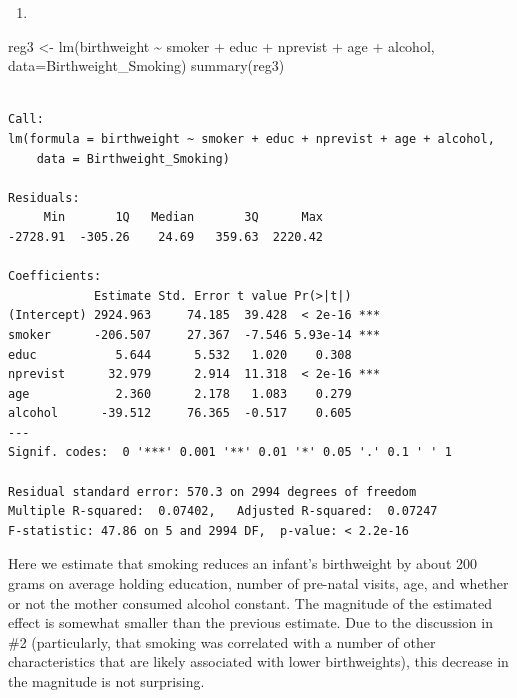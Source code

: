 \documentclass[
  letterpaper,
  DIV=11,
  numbers=noendperiod]{scrreprt}
\newenvironment{Shaded}{\begin{snugshade}}{\end{snugshade}}
\newcommand{\AttributeTok}[1]{\textcolor[rgb]{0.40,0.45,0.13}{#1}}
\newcommand{\FunctionTok}[1]{\textcolor[rgb]{0.28,0.35,0.67}{#1}}
\newcommand{\NormalTok}[1]{\textcolor[rgb]{0.00,0.23,0.31}{#1}}
\newcommand{\OtherTok}[1]{\textcolor[rgb]{0.00,0.23,0.31}{#1}}
\newcommand{\SpecialCharTok}[1]{\textcolor[rgb]{0.37,0.37,0.37}{#1}}
\providecommand{\tightlist}{%
  \setlength{\itemsep}{0pt}\setlength{\parskip}{0pt}}\usepackage{longtable,booktabs,array}
\begin{document}
\begin{enumerate}
\def\labelenumi{\arabic{enumi}.}
\setcounter{enumi}{2}
\tightlist
\item
\end{enumerate}

\begin{Shaded}
\begin{Highlighting}[]
\NormalTok{reg3 }\OtherTok{\textless{}{-}} \FunctionTok{lm}\NormalTok{(birthweight }\SpecialCharTok{\textasciitilde{}}\NormalTok{ smoker }\SpecialCharTok{+}\NormalTok{ educ }\SpecialCharTok{+}\NormalTok{ nprevist }\SpecialCharTok{+}\NormalTok{ age }\SpecialCharTok{+}\NormalTok{ alcohol,}
           \AttributeTok{data=}\NormalTok{Birthweight\_Smoking)}
\FunctionTok{summary}\NormalTok{(reg3)}
\end{Highlighting}
\end{Shaded}

\begin{verbatim}

Call:
lm(formula = birthweight ~ smoker + educ + nprevist + age + alcohol, 
    data = Birthweight_Smoking)

Residuals:
     Min       1Q   Median       3Q      Max 
-2728.91  -305.26    24.69   359.63  2220.42 

Coefficients:
            Estimate Std. Error t value Pr(>|t|)    
(Intercept) 2924.963     74.185  39.428  < 2e-16 ***
smoker      -206.507     27.367  -7.546 5.93e-14 ***
educ           5.644      5.532   1.020    0.308    
nprevist      32.979      2.914  11.318  < 2e-16 ***
age            2.360      2.178   1.083    0.279    
alcohol      -39.512     76.365  -0.517    0.605    
---
Signif. codes:  0 '***' 0.001 '**' 0.01 '*' 0.05 '.' 0.1 ' ' 1

Residual standard error: 570.3 on 2994 degrees of freedom
Multiple R-squared:  0.07402,   Adjusted R-squared:  0.07247 
F-statistic: 47.86 on 5 and 2994 DF,  p-value: < 2.2e-16
\end{verbatim}

Here we estimate that smoking reduces an infant's birthweight by about
200 grams on average holding education, number of pre-natal visits, age,
and whether or not the mother consumed alcohol constant. The magnitude
of the estimated effect is somewhat smaller than the previous estimate.
Due to the discussion in \#2 (particularly, that smoking was correlated
with a number of other characteristics that are likely associated with
lower birthweights), this decrease in the magnitude is not surprising.
\end{document}
